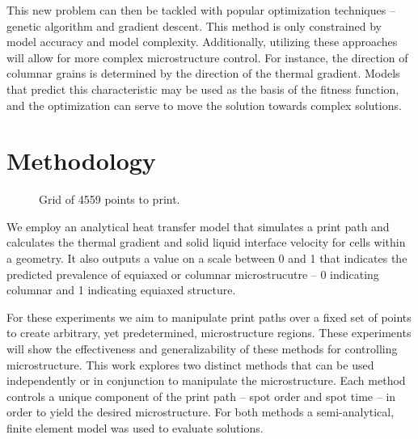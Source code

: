 \documentclass[a4paper]{article}
\begin{document}
This new problem can then be tackled with popular optimization techniques – genetic algorithm and gradient descent. This method is only constrained by model accuracy and model complexity. Additionally, utilizing these approaches will allow for more complex microstructure control. For instance, the direction of columnar grains is determined by the direction of the thermal gradient. Models that predict this characteristic may be used as the basis of the fitness function, and the optimization can serve to move the solution towards complex solutions. 


\section{Methodology}
\label{sec:methodology}

\begin{figure}
\centering
{}
\caption{\label{fig:grid}Grid of 4559 points to print.}
\end{figure}


We employ an analytical heat transfer model that simulates a print path and calculates the thermal gradient and solid liquid interface velocity for cells within a geometry. It also outputs a value on a scale between 0 and 1 that indicates the predicted prevalence of equiaxed or columnar microstrucutre – 0 indicating columnar and 1 indicating equiaxed structure. 

For these experiments we aim to manipulate print paths over a fixed set of points to create arbitrary, yet predetermined, microstructure regions. These experiments will show the effectiveness and generalizability of these methods for controlling microstructure. This work explores two distinct methods that can be used independently or in conjunction to manipulate the microstructure. Each method controls a unique component of the print path – spot order and spot time – in order to yield the desired microstructure. For both methods a semi-analytical, finite element model was used to evaluate solutions.
\end{document}
